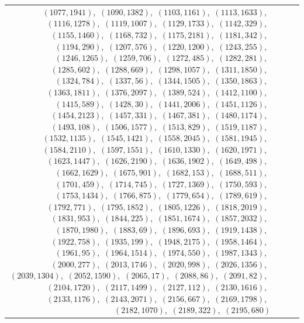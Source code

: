 \documentclass[11pt]{article}
\begin{document}
\begin{longtable}{@{}rrl>{\raggedright\arraybackslash}p{}@{}}
$(1077,1941)$,\allowbreak\ $(1090,1382)$,\allowbreak\ $(1103,1161)$,\allowbreak\ $(1113,1633)$,\allowbreak\ $(1116,1278)$,\allowbreak\ $(1119,1007)$,\allowbreak\ $(1129,1733)$,\allowbreak\ $(1142,329)$,\allowbreak\ $(1155,1460)$,\allowbreak\ $(1168,732)$,\allowbreak\ $(1175,2181)$,\allowbreak\ $(1181,342)$,\allowbreak\ $(1194,290)$,\allowbreak\ $(1207,576)$,\allowbreak\ $(1220,1200)$,\allowbreak\ $(1243,255)$,\allowbreak\ $(1246,1265)$,\allowbreak\ $(1259,706)$,\allowbreak\ $(1272,485)$,\allowbreak\ $(1282,281)$,\allowbreak\ $(1285,602)$,\allowbreak\ $(1288,669)$,\allowbreak\ $(1298,1057)$,\allowbreak\ $(1311,1850)$,\allowbreak\ $(1324,784)$,\allowbreak\ $(1337,56)$,\allowbreak\ $(1344,1505)$,\allowbreak\ $(1350,1863)$,\allowbreak\ $(1363,1811)$,\allowbreak\ $(1376,2097)$,\allowbreak\ $(1389,524)$,\allowbreak\ $(1412,1100)$,\allowbreak\ $(1415,589)$,\allowbreak\ $(1428,30)$,\allowbreak\ $(1441,2006)$,\allowbreak\ $(1451,1126)$,\allowbreak\ $(1454,2123)$,\allowbreak\ $(1457,331)$,\allowbreak\ $(1467,381)$,\allowbreak\ $(1480,1174)$,\allowbreak\ $(1493,108)$,\allowbreak\ $(1506,1577)$,\allowbreak\ $(1513,829)$,\allowbreak\ $(1519,1187)$,\allowbreak\ $(1532,1135)$,\allowbreak\ $(1545,1421)$,\allowbreak\ $(1558,2045)$,\allowbreak\ $(1581,1945)$,\allowbreak\ $(1584,2110)$,\allowbreak\ $(1597,1551)$,\allowbreak\ $(1610,1330)$,\allowbreak\ $(1620,1971)$,\allowbreak\ $(1623,1447)$,\allowbreak\ $(1626,2190)$,\allowbreak\ $(1636,1902)$,\allowbreak\ $(1649,498)$,\allowbreak\ $(1662,1629)$,\allowbreak\ $(1675,901)$,\allowbreak\ $(1682,153)$,\allowbreak\ $(1688,511)$,\allowbreak\ $(1701,459)$,\allowbreak\ $(1714,745)$,\allowbreak\ $(1727,1369)$,\allowbreak\ $(1750,593)$,\allowbreak\ $(1753,1434)$,\allowbreak\ $(1766,875)$,\allowbreak\ $(1779,654)$,\allowbreak\ $(1789,619)$,\allowbreak\ $(1792,771)$,\allowbreak\ $(1795,1852)$,\allowbreak\ $(1805,1226)$,\allowbreak\ $(1818,2019)$,\allowbreak\ $(1831,953)$,\allowbreak\ $(1844,225)$,\allowbreak\ $(1851,1674)$,\allowbreak\ $(1857,2032)$,\allowbreak\ $(1870,1980)$,\allowbreak\ $(1883,69)$,\allowbreak\ $(1896,693)$,\allowbreak\ $(1919,1438)$,\allowbreak\ $(1922,758)$,\allowbreak\ $(1935,199)$,\allowbreak\ $(1948,2175)$,\allowbreak\ $(1958,1464)$,\allowbreak\ $(1961,95)$,\allowbreak\ $(1964,1514)$,\allowbreak\ $(1974,550)$,\allowbreak\ $(1987,1343)$,\allowbreak\ $(2000,277)$,\allowbreak\ $(2013,1746)$,\allowbreak\ $(2020,998)$,\allowbreak\ $(2026,1356)$,\allowbreak\ $(2039,1304)$,\allowbreak\ $(2052,1590)$,\allowbreak\ $(2065,17)$,\allowbreak\ $(2088,86)$,\allowbreak\ $(2091,82)$,\allowbreak\ $(2104,1720)$,\allowbreak\ $(2117,1499)$,\allowbreak\ $(2127,112)$,\allowbreak\ $(2130,1616)$,\allowbreak\ $(2133,1176)$,\allowbreak\ $(2143,2071)$,\allowbreak\ $(2156,667)$,\allowbreak\ $(2169,1798)$,\allowbreak\ $(2182,1070)$,\allowbreak\ $(2189,322)$,\allowbreak\ $(2195,680)$\\

\end{longtable}
\end{document}

